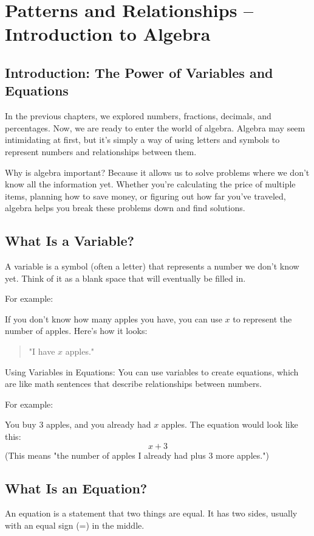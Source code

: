 \chapter{Patterns and Relationships – Introduction to Algebra}
\section{Introduction: The Power of Variables and Equations}
In the previous chapters, we explored numbers, fractions, decimals, and percentages. Now, we are ready to enter the world of algebra. Algebra may seem intimidating at first, but it's simply a way of using letters and symbols to represent numbers and relationships between them.

Why is algebra important? Because it allows us to solve problems where we don't know all the information yet. Whether you're calculating the price of multiple items, planning how to save money, or figuring out how far you've traveled, algebra helps you break these problems down and find solutions.

\section{What Is a Variable?}
A variable is a symbol (often a letter) that represents a number we don’t know yet. Think of it as a blank space that will eventually be filled in.

For example:

If you don’t know how many apples you have, you can use $x$ to represent the number of apples.
Here’s how it looks:

\begin{quote}
"I have $x$ apples."
\end{quote}

Using Variables in Equations: You can use variables to create equations, which are like math sentences that describe relationships between numbers.

For example:

You buy 3 apples, and you already had $x$ apples. The equation would look like this:
\[ x + 3 \]
(This means "the number of apples I already had plus 3 more apples.")

\section{What Is an Equation?}
An equation is a statement that two things are equal. It has two sides, usually with an equal sign (=) in the middle.

